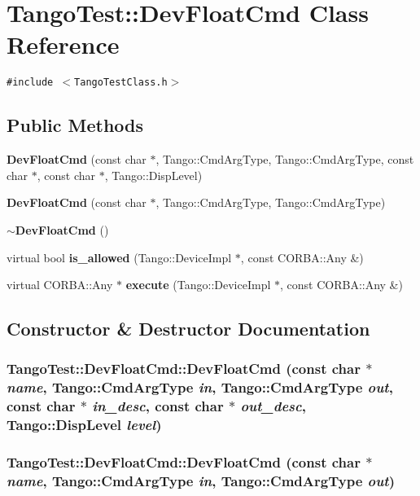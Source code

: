 \section{Tango\-Test::Dev\-Float\-Cmd  Class Reference}
\label{classTangoTest_1_1DevFloatCmd}
{\tt \#include $<$Tango\-Test\-Class.h$>$}

\subsection*{Public Methods}
\begin{CompactItemize}
\item 
{\bf Dev\-Float\-Cmd} (const char $\ast$, Tango::Cmd\-Arg\-Type, Tango::Cmd\-Arg\-Type, const char $\ast$, const char $\ast$, Tango::Disp\-Level)
\item 
{\bf Dev\-Float\-Cmd} (const char $\ast$, Tango::Cmd\-Arg\-Type, Tango::Cmd\-Arg\-Type)
\item 
{\bf $\sim$Dev\-Float\-Cmd} ()
\item 
virtual bool {\bf is\_\-allowed} (Tango::Device\-Impl $\ast$, const CORBA::Any \&)
\item 
virtual CORBA::Any $\ast$ {\bf execute} (Tango::Device\-Impl $\ast$, const CORBA::Any \&)
\end{CompactItemize}


\subsection{Constructor \& Destructor Documentation}
\subsubsection{\setlength{\rightskip}{0pt plus 5cm}Tango\-Test::Dev\-Float\-Cmd::Dev\-Float\-Cmd (const char $\ast$ {\em name}, Tango::Cmd\-Arg\-Type {\em in}, Tango::Cmd\-Arg\-Type {\em out}, const char $\ast$ {\em in\_\-desc}, const char $\ast$ {\em out\_\-desc}, Tango::Disp\-Level {\em level})}\label{classTangoTest_1_1DevFloatCmd_a0}


\subsubsection{\setlength{\rightskip}{0pt plus 5cm}Tango\-Test::Dev\-Float\-Cmd::Dev\-Float\-Cmd (const char $\ast$ {\em name}, Tango::Cmd\-Arg\-Type {\em in}, Tango::Cmd\-Arg\-Type {\em out})}\label{classTangoTest_1_1DevFloatCmd_a1}


